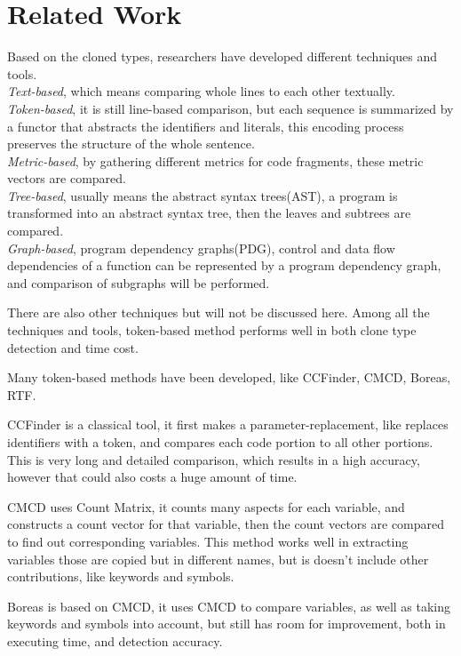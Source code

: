 \documentclass[../main.tex]{subfiles}
\begin{document}
\section{Related Work}


Based on the cloned types, researchers have developed different techniques and tools. 
\\ \indent \emph{Text-based}, which means comparing whole lines to each other textually. 
\\ \indent \emph{Token-based}, it is still line-based comparison, but each sequence is summarized by a functor that abstracts the identifiers and literals, this encoding process preserves the structure of the whole sentence.
\\ \indent \emph{Metric-based}, by gathering different metrics for code fragments, these metric vectors are compared.
\\ \indent \emph{Tree-based}, usually means the abstract syntax trees(AST), a program is transformed into an abstract syntax tree, then the leaves and subtrees are compared.
\\ \indent \emph{Graph-based}, program dependency graphs(PDG), control and data flow dependencies of a function can be represented by a program dependency graph, and comparison of subgraphs will be performed.

There are also other techniques but will not be discussed here.
Among all the techniques and tools, token-based method performs well in both clone type detection and time cost.



Many token-based methods have been developed, like CCFinder\cite{CCFinder}, CMCD\cite{CMCD},  Boreas\cite{Boreas}, RTF\cite{RTF}. 

CCFinder is a classical tool, it first makes a parameter-replacement, like replaces identifiers with a token, and compares each code portion to all other portions. This is very long and detailed comparison, which results in a high accuracy, however that could also costs a huge amount of time.

CMCD uses Count Matrix, it counts many aspects for each variable, and constructs a count vector for that variable, then the count vectors are compared to find out corresponding variables. This method works well in extracting variables those are copied but in different names, but is doesn't include other contributions, like keywords and symbols.

Boreas is based on CMCD, it uses CMCD to compare variables, as well as taking keywords and symbols into account, but still has room for improvement, both in executing time, and detection accuracy. 
\end{document}
